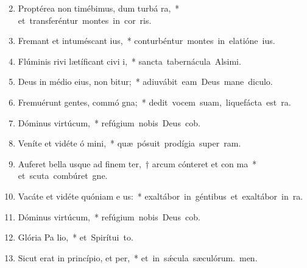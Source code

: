 \begin{flushleft}
\begin{enumerate}[leftmargin=*]
\setcounter{enumi}{1}

\item Proptérea non timébimus, dum turbá ra,~* \mbox{et transferéntur montes in cor ris.}

\item Fremant et intuméscant  ius,~* \mbox{conturbéntur montes in elatióne ius.}

\item Flúminis rivi lætíficant civi i,~* \mbox{sancta tabernácula Alsimi.}

\item Deus in médio eius, non bitur;~* \mbox{adiuvábit eam Deus mane diculo.}

\item Fremuérunt gentes, commó gna;~* \mbox{dedit vocem suam, liquefácta est ra.}

\item Dóminus virtúcum,~* \mbox{refúgium nobis Deus cob.}

\item Veníte et vidéte ó mini,~* \mbox{quæ pósuit prodígia super ram.}

\item Auferet bella usque ad finem ter,~† arcum cónteret et con ma~* \mbox{et scuta combúret gne.}

\item Vacáte et vidéte quóniam e us:~* \mbox{exaltábor in géntibus et exaltábor in ra.}

\item Dóminus virtúcum,~* \mbox{refúgium nobis Deus cob.}

\item Glória Pa lio,~* \mbox{et Spirítui to.}

\item Sicut erat in princípio, et  per,~* \mbox{et in s\'{\ae}cula sæculórum. men.}

\end{enumerate}
\end{flushleft}

